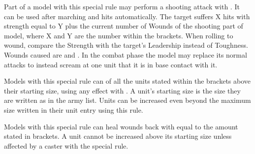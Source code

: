 

Part of a model with this special rule may perform a shooting  attack with . It can be used after marching and hits automatically. The target suffers X hits with strength equal to Y plus the current number of Wounds of the shooting part of model, where X and Y are the number within the brackets. When rolling to wound, compare the Strength with the target's Leadership instead of Toughness. Wounds caused are  and \magicalattacks{}. In the combat phase the model may replace its normal attacks to instead scream at one unit that it is in base contact with it.


Models with this special rule can \raisewounds{} of all the units stated within the brackets above their starting size, using any effect with \raisewounds{}. A unit's starting size is the size they are written as in the army list. Units can be increased even beyond the maximum size written in their unit entry using this rule.


Models with this special rule can heal wounds back with \necromancysignaturespell{} equal to the amount stated in brackets. A unit cannot be increased above its starting size unless affected by a caster with the \awaken{} special rule.

\armyspecialruleentry{\reaper}



